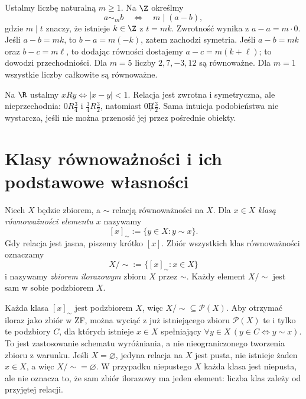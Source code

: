 \begin{przyklad}\label{ex:eq-congruence}
Ustalmy liczbę naturalną $m\ge1$. Na $\Z$ określmy
\[
 a\sim_m b\quad\Longleftrightarrow\quad
 m\mid(a-b),
\]
gdzie $m\mid t$ znaczy, że istnieje $k\in\Z$ z $t=mk$.
Zwrotność wynika z $a-a=m\cdot0$. Jeśli $a-b=mk$, to
$b-a=m(-k)$, zatem zachodzi symetria. Jeśli
$a-b=mk$ oraz $b-c=m\ell$, to dodając równości dostajemy
$a-c=m(k+\ell)$; to dowodzi przechodniości.
Dla $m=5$ liczby $2,7,-3,12$ są równoważne. Dla $m=1$
wszystkie liczby całkowite są równoważne.
\end{przyklad}

\begin{przyklad}
Na $\R$ ustalmy $xRy\iff |x-y|<1$. Relacja jest zwrotna
i symetryczna, ale nieprzechodnia: $0R\frac34$ i
$\frac34R\frac32$, natomiast $0\not R\frac32$.
Sama intuicja podobieństwa nie wystarcza, jeśli nie można
przenosić jej przez pośrednie obiekty.
\end{przyklad}

\section{Klasy równoważności i ich podstawowe własności}
\label{sec:eq-classes}
\begin{definicja}\label{def:eq-class}
Niech $X$ będzie zbiorem, a $\sim$ relacją równoważności na $X$.
Dla $x\in X$ \emph{klasą równoważności elementu $x$} nazywamy
\[
 [x]_{\sim}:=\{y\in X:y\sim x\}.
\]
Gdy relacja jest jasna, piszemy krótko $[x]$. Zbiór
wszystkich klas równoważności oznaczamy
\[
 X/{\sim}:=\{[x]_{\sim}:x\in X\}
\]
i nazywamy \emph{zbiorem ilorazowym} zbioru $X$ przez $\sim$.
Każdy element $X/{\sim}$ jest sam w sobie podzbiorem $X$.
\end{definicja}

\begin{uwaga}
Każda klasa $[x]_{\sim}$ jest podzbiorem $X$, więc
$X/{\sim}\subseteq\mathcal P(X)$. Aby otrzymać iloraz jako
zbiór w ZF, można wyciąć z już istniejącego zbioru
$\mathcal P(X)$ te i tylko te podzbiory $C$, dla których
istnieje $x\in X$ spełniający
$\forall y\in X\,(y\in C\iff y\sim x)$.
To jest zastosowanie schematu wyróżniania, a nie
nieograniczonego tworzenia zbioru z warunku.
Jeśli $X=\varnothing$, jedyna relacja na $X$ jest pusta,
nie istnieje żaden $x\in X$, a więc $X/{\sim}=\varnothing$.
W przypadku niepustego $X$ każda klasa jest niepusta,
ale nie oznacza to, że sam zbiór ilorazowy ma jeden element:
liczba klas zależy od przyjętej relacji.
\end{uwaga}



